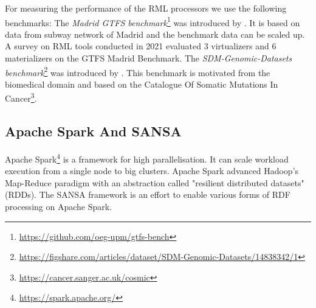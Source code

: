 For measuring the performance of the RML processors we use the following benchmarks:
The \emph{Madrid GTFS benchmark}\footnote{\url{https://github.com/oeg-upm/gtfs-bench}} was introduced by \cite{chaves2020gtfs}.
It is based on data from subway network of Madrid and the benchmark data can be scaled up.
A survey on RML tools\cite{ArenasGuerrero2021} conducted in 2021 evaluated 3 virtualizers and 6 materializers on the GTFS Madrid Benchmark.
The \emph{SDM-Genomic-Datasets benchmark}\footnote{\url{https://figshare.com/articles/dataset/SDM-Genomic-Datasets/14838342/1}} was introduced by \cite{Iglesias2020}.
This benchmark is motivated from the biomedical domain and based on the Catalogue Of Somatic Mutations In Cancer\footnote{\url{https://cancer.sanger.ac.uk/cosmic}}.







\subsection{Apache Spark And SANSA}
Apache Spark\footnote{\url{https://spark.apache.org/}} is a framework for high parallelisation. It can scale workload execution from a single node to big clusters. Apache Spark advanced Hadoop's Map-Reduce paradigm with an abstraction called "resilient distributed datasets" (RDDs).
The SANSA framework\cite{lehmann2017distributed} is an effort to enable various forms of RDF processing on Apache Spark.

